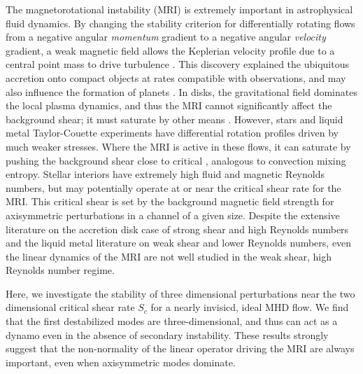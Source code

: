\documentclass[aps,prl,reprint,superscriptaddress]{revtex4-1}
\begin{document}
\pacs{}
\maketitle

The magnetorotational instability (MRI) is extremely important in astrophysical fluid dynamics.
By changing the stability criterion for differentially rotating flows from a negative angular \emph{momentum} gradient to a negative angular \emph{velocity} gradient, a weak magnetic field allows the Keplerian velocity profile due to a central point mass to drive turbulence \citep[e.g.][]{1998RvMP...70....1B,2010RSPTA.368.1607J}.
This discovery explained the ubiquitous accretion onto compact objects at rates compatible with observations, and may also influence the formation of planets \citep[e.g.][]{2007Natur.448.1022J}.
In disks, the gravitational field dominates the local plasma dynamics, and thus the MRI cannot significantly affect the background shear; it must saturate by other means \citep{2018MNRAS.474.3451X}.
However, stars and liquid metal Taylor-Couette experiments have differential rotation profiles driven by much weaker stresses.
Where the MRI is active in these flows, it can saturate by pushing the background shear close to critical \citep{2015RSPSA.47140699V,2017ApJ...841....1C,2017ApJ...841....2C}, analogous to convection mixing entropy.
Stellar interiors have extremely high fluid and magnetic Reynolds numbers, but may potentially operate at or near the critical shear rate for the MRI.
This critical shear is set by the background magnetic field strength for axisymmetric perturbations in a channel of a given size.
Despite the extensive literature on the accretion disk case of strong shear and high Reynolds numbers and the liquid metal literature on weak shear and lower Reynolds numbers, even the linear dynamics of the MRI are not well studied in the weak shear, high Reynolds number regime.

Here, we investigate the stability of three dimensional perturbations near the two dimensional critical shear rate $S_c$ for a nearly invisicd, ideal MHD flow.
We find that the first destabilized modes are three-dimensional, and thus can act as a dynamo even in the absence of secondary instability.
These results strongly suggest that the non-normality of the linear operator driving the MRI are always important, even when axisymmetric modes dominate.
\end{document}
